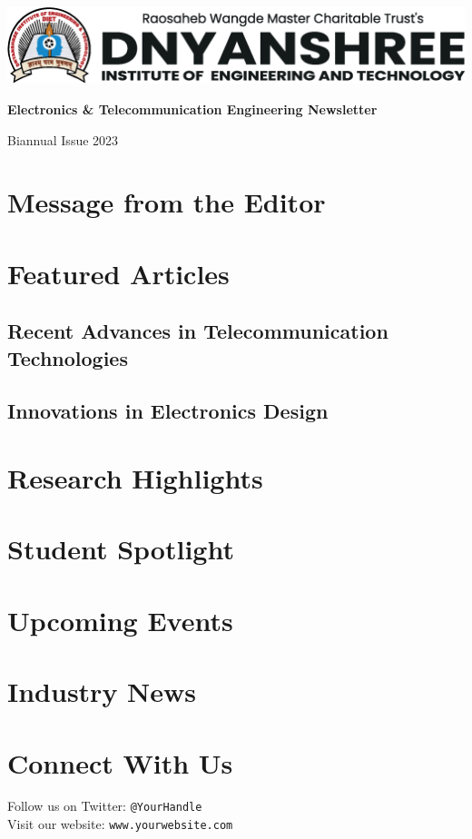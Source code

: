 \documentclass[letterpaper, 10pt]{article}
\begin{document}
\begin{titlepage}
    \centering
    \vspace*{\fill}
    \includegraphics[width=\textwidth]{dietlogo.png}\par
    \vspace{1cm}
    {\LARGE\bfseries Electronics \& Telecommunication Engineering Newsletter\par}
    \vspace{0.5cm}
    {\Large Biannual Issue 2023\par}
    \vspace*{\fill}
\end{titlepage}

\section*{Message from the Editor}
\lipsum[1]

\section*{Featured Articles}
\subsection*{Recent Advances in Telecommunication Technologies}
\lipsum[2]

\subsection*{Innovations in Electronics Design}
\lipsum[3]

\section*{Research Highlights}
\lipsum[4]

\section*{Student Spotlight}
\lipsum[5]

\section*{Upcoming Events}
\lipsum[6]

\section*{Industry News}
\lipsum[7]

\section*{Connect With Us}
Follow us on Twitter: \texttt{@YourHandle}\\
Visit our website: \texttt{www.yourwebsite.com}
\end{document}
